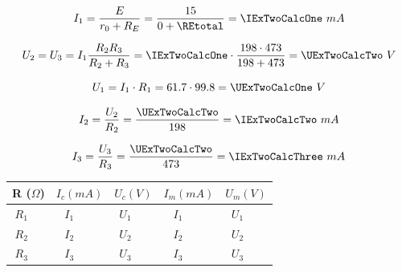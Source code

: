 \documentclass{article}
\begin{document}
		\[
			I_1 = \frac{E}{r_0 + R_E} = \frac{15}{0 + \REtotal} = \IExTwoCalcOne \ mA
		\]


		\[
			U_2 = U_3 = I_1 \frac{R_2 R_3}{R_2 + R_3} =
				\IExTwoCalcOne \cdot \frac{\RTwo \cdot \RMax}{\RTwo + \RMax} =
				\UExTwoCalcTwo \ V
		\]


		\[
			U_1 = I_1 \cdot R_1 = \IExTwoOne \cdot \ROne = \UExTwoCalcOne \ V
		\]


		\[
			I_2 = \frac{U_2}{R_2} = \frac{\UExTwoCalcTwo}{\RTwo} = \IExTwoCalcTwo \ mA
		\]


		\[
			I_3 = \frac{U_3}{R_3} = \frac{\UExTwoCalcTwo}{\RMax} = \IExTwoCalcThree \ mA
		\]


		\begin{center} \begin{tabular}{|c|c|c|c|c|c|c|c|c|c|}
			\hline
				\multicolumn{2}{|c|}{R ($\Omega$)} &
				\multicolumn{2}{c|}{$I_c (mA)$} &
				\multicolumn{2}{c|}{$U_c (V)$} &
				\multicolumn{2}{c|}{$I_m (mA)$} &
				\multicolumn{2}{c|}{$U_m (V)$}\\
			\hline

			$R_1$ & \ROne & $I_1$ & \IExTwoCalcOne & $U_1$ & \UExTwoCalcOne & $I_1$ & \IExTwoOne & $U_1$ & \UExTwoOne\\
			\hline

			$R_2$ & \RTwo & $I_2$ & \IExTwoCalcTwo & $U_2$ & \UExTwoCalcTwo & $I_2$ & \IExTwoTwo & $U_2$ & \UExTwoTwo\\
			\hline

			$R_3$ & \RMax & $I_3$ & \IExTwoCalcThree & $U_3$ & \UExTwoCalcTwo & $I_3$ & \IExTwoThree & $U_3$ & \UExTwoThree\\
			\hline
		\end{tabular} \end{center}
\end{document}
